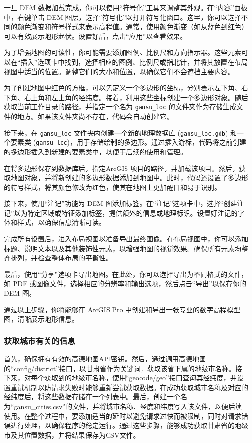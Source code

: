 \documentclass{article}
\begin{document}
		一旦 DEM 数据加载完成，你可以使用“符号化”工具来调整其外观。在“内容”面板中，右键单击 DEM 图层，选择“符号化”以打开符号化窗口。这里，你可以选择不同的颜色渐变和符号样式来表示高程值。通常，使用颜色渐变（如从蓝色到红色）可以有效展示地形起伏。设置好后，点击“应用”以查看效果。
		
		为了增强地图的可读性，你可能需要添加图例、比例尺和方向指示器。这些元素可以在“插入”选项卡中找到，选择相应的图例、比例尺或指北针，并将其放置在布局视图中适当的位置。调整它们的大小和位置，以确保它们不会遮挡主要内容。
		
		为了创建地图中红色的方框，可以先定义一个多边形的坐标，分别表示左下角、右下角、右上角和左上角的经纬度。接着，利用这些坐标创建一个多边形对象。随后获取当前工作目录的路径，并指定一个名为 \texttt{gansu\_loc} 的文件夹作为存储生成文件的地方。如果该文件夹尚不存在，代码会自动创建它。
		
		接下来，在 \texttt{gansu\_loc} 文件夹内创建一个新的地理数据库 (\texttt{gansu\_loc.gdb}) 和一个要素类 (\texttt{gansu\_loc})，用于存储绘制的多边形。通过插入游标，代码将之前创建的多边形插入到新建的要素类中，以便于后续的使用和管理。

		在将多边形保存到数据库后，指定ArcGIS 项目的路径，并加载该项目。然后，获取地图对象，并将新创建的多边形数据添加到地图中。此时，代码还设置了多边形的符号样式，将其颜色修改为红色，使其在地图上更加醒目和易于识别。
		
		接下来，使用“注记”功能为 DEM 图添加标签。在“注记”选项卡中，选择“创建注记”以为特定区域或特征添加标签，提供额外的信息或地理标识。设置好注记的字体和样式，以确保信息清晰可读。
		
		完成所有设置后，进入布局视图以准备导出最终图像。在布局视图中，你可以添加标题、说明文本以及其他装饰性元素，以增强地图的视觉效果。确保所有元素均整齐排列，并检查整体布局的平衡性。
		
		最后，使用“分享”选项卡导出地图。在此处，你可以选择导出为不同格式的文件，如 PDF 或图像文件，选择相应的分辨率和输出选项，然后点击“导出”以保存你的 DEM 图。
		
		通过以上步骤，你将能够在 ArcGIS Pro 中创建和导出一张专业的数字高程模型图，清晰展示地形信息。
		
						\subsubsection{获取城市有关的信息}
首先，确保拥有有效的高德地图API密钥。然后，通过调用高德地图的“config/district”接口，以甘肃省作为关键词，获取该省下属的地级市名称。接下来，对每个获取到的地级市名称，使用“geocode/geo”接口查询其经纬度，并设置重试机制以防请求失败时能够重新尝试获取数据。在成功获取城市名称及对应的经纬度后，将这些数据存储在一个列表中。最后，创建一个名为“gansu\_cities.csv”的文件，并将城市名称、经度和纬度写入该文件，以便后续使用。在整个过程中，要添加适当的延时以避免请求过快而被限制，同时对请求错误进行处理，以确保程序的稳定运行。通过这些步骤，能够成功获取甘肃省的地级市及其位置数据，并将结果保存为CSV文件。
\end{document}
